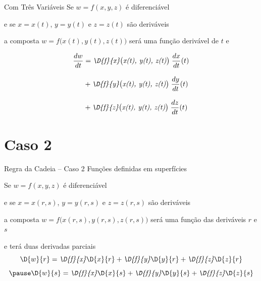 


\begin{frame}{Com Três Variáveis}
    Se \(w=f(x, y, z)\) é diferenciável

    \pause
     e se \(x=x(t)\), \(y=y(t)\) e \(z=z(t)\) são deriváveis

    \pause
    a composta \(w=f\big(x(t), y(t), z(t)\big)\) será uma função derivável de $t$ e

    \pause
    \begin{align*}
        \frac{dw}{dt}
        & = \emph{\D{f}{x}\big(x(t), y(t), z(t)\big)} \; \frac{dx}{dt}(t) \\[3mm]
        & + \emph{\D{f}{y}\big(x(t), y(t), z(t)\big)} \; \frac{dy}{dt}(t) \\[3mm]
        & + \emph{\D{f}{z}\big(x(t), y(t), z(t)\big)} \; \frac{dz}{dt}(t)
    \end{align*}
\end{frame}


\section{Caso 2}

\begin{frame}{Regra da Cadeia -- Caso 2 }
    Funções definidas em superfícies
    \vspace{0.5\baselineskip}

    \pause
    Se \(w=f(x, y, z)\) é diferenciável

    \pause
    e se \(x=x(r, s)\), \(y=y(r, s)\) e \(z=z(r, s)\) são deriváveis

    \pause
    a composta \(w=f\big(x(r, s), y(r, s), z(r, s)\big)\)
    será uma função das deriváveis $r$ e $s$

    \pause
    e terá duas derivadas parciais
    \[
        \D{w}{r}
        = \emph{\D{f}{x}} \D{x}{r}
        + \emph{\D{f}{y}} \D{y}{r}
        + \emph{\D{f}{z}} \D{z}{r}
    \]
    \[
        \pause
        \D{w}{s}
        = \emph{\D{f}{x}} \D{x}{s}
        + \emph{\D{f}{y}} \D{y}{s}
        + \emph{\D{f}{z}} \D{z}{s}
    \]
\end{frame}

